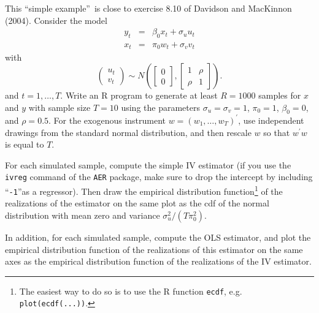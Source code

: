 \documentclass{article}
\begin{document}
This \textquotedblleft simple example\textquotedblright\ is close to
exercise 8.10 of Davidson and MacKinnon (2004). Consider the model%
\begin{eqnarray*}
y_{t} &=&\beta _{0}x_{t}+\sigma _{u}u_{t} \\
x_{t} &=&\pi _{0}w_{t}+\sigma _{v}v_{t}
\end{eqnarray*}%
with%
\begin{equation*}
\left(
\begin{array}{c}
u_{t} \\
v_{t}%
\end{array}%
\right) \sim N\left( \left[
\begin{array}{c}
0 \\
0%
\end{array}%
\right] ,\left[
\begin{array}{cc}
1 & \rho \\
\rho & 1%
\end{array}%
\right] \right) .
\end{equation*}%
and $t=1,\ldots ,T$. Write an R program to generate at least $R=1000$
samples for $x$ and $y$ with sample size $T=10$ using the parameters $\sigma
_{u}=\sigma _{v}=1$, $\pi _{0}=1$, $\beta _{0}=0$, and $\rho =0.5$. For the
exogenous instrument $w=(w_{1},\ldots ,w_{T})^{\prime }$, use independent
drawings from the standard normal distribution, and then rescale $w$ so that
$w^{\prime }w$ is equal to $T$.

For each simulated sample, compute the simple IV estimator (if you use the
\texttt{ivreg} command of the \texttt{AER} package, make sure to drop the
intercept by including \textquotedblleft \texttt{-1}\textquotedblright as a
regressor). Then draw the empirical distribution function\footnote{%
The easiest way to do so is to use the R function \texttt{ecdf}, e.g.
\texttt{plot(ecdf(...))}.} of the realizations of the estimator on the same
plot as the cdf of the normal distribution with mean zero and variance $%
\sigma _{u}^{2}/(T\pi _{0}^{2})$.

In addition, for each simulated sample, compute the OLS estimator, and plot
the empirical distribution function of the realizations of this estimator on
the same axes as the empirical distribution function of the realizations of
the IV estimator.
\end{document}
